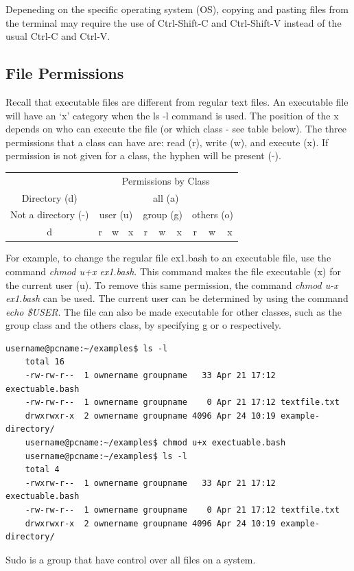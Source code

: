 \documentclass[12pt]{article}
\begin{document}
\quad Depeneding on the specific operating system (OS), copying and pasting files from the terminal may require the use of Ctrl-Shift-C and Ctrl-Shift-V instead of the usual Ctrl-C and Ctrl-V. 


\subsection{File Permissions}
\quad\enskip\quad Recall that executable files are different from regular text files. An executable file will have an `x' category when the ls -l command is used. The position of the x depends on who can execute the file (or which class - see table below). The three permissions that a class can have are: read (r), write (w), and execute (x). If permission is not given for a class, the hyphen will be present (-).

\begin{table}[H]
\centering
{\renewcommand{\arraystretch}{1.2}%
\begin{tabular}{cccc|ccc|ccc}
 & \multicolumn{9}{|c}{Permissions by Class} \\
\cline{2-10}
Directory (d) & \multicolumn{9}{|c}{all (a)} \\
\cline{2-10}
Not a directory (-) & \multicolumn{3}{|c|}{user (u)} & \multicolumn{3}{c|}{group (g)} & \multicolumn{3}{c}{others (o)} \\
\hline
d & \multicolumn{1}{|c}{r} & w & x & r & w & x & r & w & x 
\end{tabular}
}
\end{table}
\quad For example, to change the regular file ex1.bash to an executable file, use the command \textit{chmod u+x ex1.bash}. This command makes the file executable (x) for the current user (u). To remove this same permission, the command \textit{chmod u-x ex1.bash} can be used. The current user can be determined by using the command \textit{echo \$USER}. The file can also be made executable for other classes, such as the group class and the others class, by specifying g or o respectively.

\begin{lstlisting}[numbers=none]
	username@pcname:~/examples$ ls -l
	total 16
	-rw-rw-r--  1 ownername groupname   33 Apr 21 17:12 exectuable.bash
	-rw-rw-r--  1 ownername groupname    0 Apr 21 17:12 textfile.txt
	drwxrwxr-x  2 ownername groupname 4096 Apr 24 10:19 example-directory/	
	username@pcname:~/examples$ chmod u+x exectuable.bash 
	username@pcname:~/examples$ ls -l
	total 4
	-rwxrw-r--  1 ownername groupname   33 Apr 21 17:12 exectuable.bash
	-rw-rw-r--  1 ownername groupname    0 Apr 21 17:12 textfile.txt
	drwxrwxr-x  2 ownername groupname 4096 Apr 24 10:19 example-directory/
\end{lstlisting}
\quad\enskip\quad Sudo is a group that have control over all files on a system.
\end{document}
